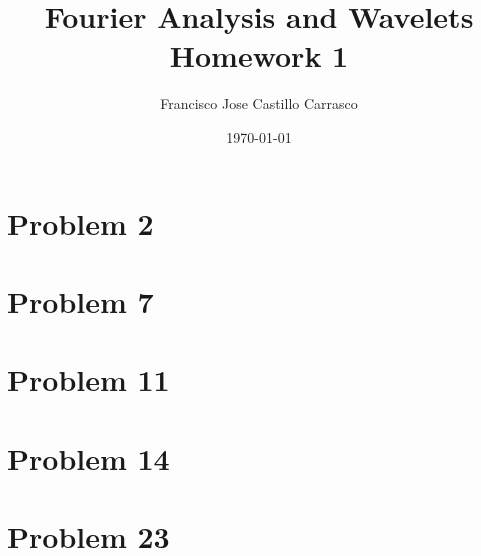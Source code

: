 




\title{Fourier Analysis and Wavelets\\Homework 1}
\author{Francisco Jose Castillo Carrasco}
\date{\today}
\maketitle




\section*{Problem 2}

\newpage
\section*{Problem 7}

\newpage
\section*{Problem 11}


\section*{Problem 14}

\newpage
\section*{Problem 23}




